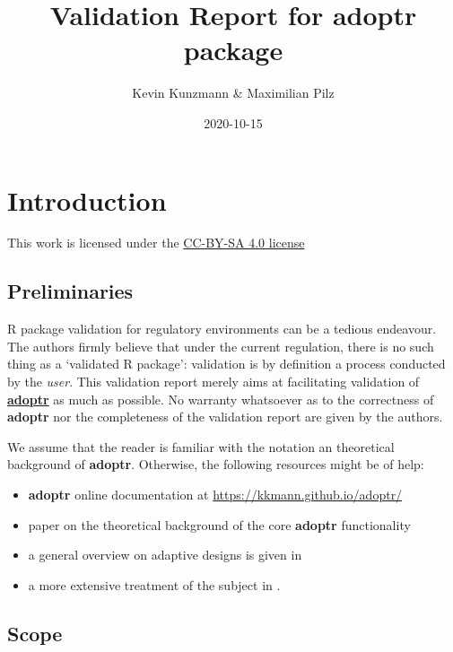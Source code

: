\documentclass[
]{book}
\title{Validation Report for \textbf{adoptr} package}
\author{Kevin Kunzmann \& Maximilian Pilz}
\date{2020-10-15}
\providecommand{\tightlist}{%
  \setlength{\itemsep}{0pt}\setlength{\parskip}{0pt}}
\begin{document}
\maketitle

{
\setcounter{tocdepth}{1}
\tableofcontents
}
\hypertarget{introduction}{%
\chapter{Introduction}\label{introduction}}

This work is licensed under the \href{https://creativecommons.org/licenses/by-sa/4.0/deed.en}{CC-BY-SA 4.0 license}

\hypertarget{preliminaries}{%
\section{Preliminaries}\label{preliminaries}}

R package validation for regulatory environments can be a
tedious endeavour.
The authors firmly believe that under the current regulation,
there is no such thing as a `validated R package':
validation is by definition a process conducted by the \emph{user}.
This validation report merely aims at facilitating
validation of \textbf{\href{https://github.com/kkmann/adoptr}{adoptr}} as
much as possible.
No warranty whatsoever as to the correctness of \textbf{adoptr} nor the
completeness of the validation report are given by the authors.

We assume that the reader is familiar with the notation an theoretical
background of \textbf{adoptr}.
Otherwise, the following resources might be of help:

\begin{itemize}
\tightlist
\item
  \textbf{adoptr} online documentation at \url{https://kkmann.github.io/adoptr/}
\item
  paper on the theoretical background of the core \textbf{adoptr} functionality \citep{variational}
\item
  a general overview on adaptive designs is given in \citep{Bauer2015}
\item
  a more extensive treatment of the subject in \citep{Wassmer2016}.
\end{itemize}

\hypertarget{scope}{%
\section{Scope}\label{scope}}
\end{document}
